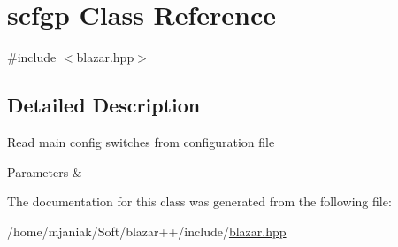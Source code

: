 \hypertarget{classscfgp}{\section{scfgp Class Reference}
\label{classscfgp}
}


{\ttfamily \#include $<$blazar.\-hpp$>$}



\subsection{Detailed Description}
Read main config switches from configuration file 
\begin{DoxyParams}{Parameters}
{\em } & \\
\hline
\end{DoxyParams}


The documentation for this class was generated from the following file\-:\begin{DoxyCompactItemize}
\item 
/home/mjaniak/\-Soft/blazar++/include/\hyperlink{blazar_8hpp}{blazar.\-hpp}\end{DoxyCompactItemize}

